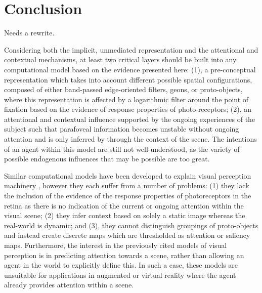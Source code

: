 \documentclass[a4paper,11pt,final]{ThesisStyle}
\begin{document}
\section{Conclusion}

Needs a rewrite.

Considering both the implicit, unmediated representation and the attentional and contextual mechanisms, at least two critical layers should be built into any computational model based on the evidence presented here:  (1), a pre-conceptual representation which takes into account different possible spatial configurations, composed of either band-passed edge-oriented filters, geons, or proto-objects, where this representation is affected by a logarithmic filter around the point of fixation based on the evidence of response properties of photo-receptors; (2), an attentional and contextual influence supported by the ongoing experiences of the subject such that parafoveal information becomes unstable without ongoing attention and is only inferred by through the context of the scene.  The intentions of an agent within this model are still not well-understood, as the variety of possible endogenous influences that may be possible are too great.  

Similar computational models have been developed to explain visual perception machinery \cite{Walther2006,Orabona2007a}, however they each suffer from a number of problems: (1) they lack the inclusion of the evidence of the response properties of photoreceptors in the retina as there is no indication of the current or ongoing attention within the visual scene; (2) they infer context based on solely a static image whereas the real-world is dynamic; and (3), they cannot distinguish groupings of proto-objects and instead create discrete maps which are thresholded as attention or saliency maps.  Furthermore, the interest in the previously cited models of visual perception is in predicting attention towards a scene, rather than allowing an agent in the world to explicitly define this.  In such a case, these models are unsuitable for applications in augmented or virtual reality where the agent already provides attention within a scene.  




\end{document}

